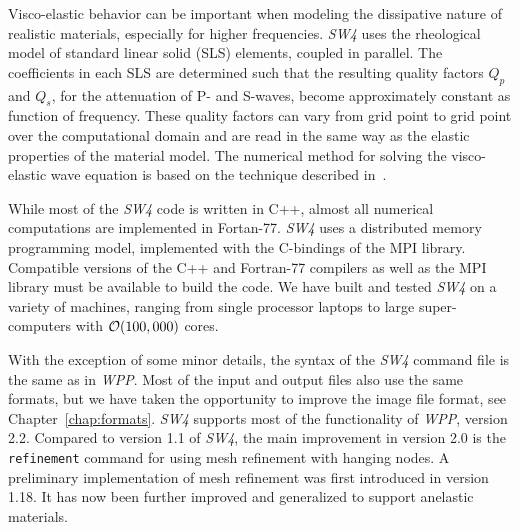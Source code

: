 \documentclass[11pt]{report}
\begin{document}
Visco-elastic behavior can be important when modeling the dissipative nature of realistic materials,
especially for higher frequencies. \emph{SW4} uses the rheological model of standard linear solid
(SLS) elements, coupled in parallel. The coefficients in each SLS are determined such that the
resulting quality factors $Q_p$ and $Q_s$, for the attenuation of P- and S-waves, become
approximately constant as function of frequency. These quality factors can vary from grid point to
grid point over the computational domain and are read in the same way as the elastic properties of
the material model. The numerical method for solving the visco-elastic wave equation is
based on the technique described in~\cite{PetSjo-10b}.

While most of the \emph{SW4} code is written in C++, almost all numerical computations are
implemented in Fortan-77. \emph{SW4} uses a distributed memory programming model, implemented with
the C-bindings of the MPI library. Compatible versions of the C++ and Fortran-77 compilers as well
as the MPI library must be available to build the code. We have built and tested
\emph{SW4} on a variety of machines, ranging from single processor laptops to large super-computers
with ${\cal O}(100,000)$ cores.

With the exception of some minor details, the syntax of the \emph{SW4} command file is the same as
in \emph{WPP}. Most of the input and output files also use the same formats, but we have taken the
opportunity to improve the image file format, see Chapter~\ref{chap:formats}. 
\emph{SW4} supports most of the functionality of \emph{WPP}, version 2.2. Compared
to version 1.1 of \emph{SW4}, the main improvement in version 2.0 is the \verb+refinement+ command for
using mesh refinement with hanging nodes. A preliminary implementation of mesh refinement was first
introduced in version 1.18. It has now been further improved and generalized to support anelastic materials.

\end{document}
